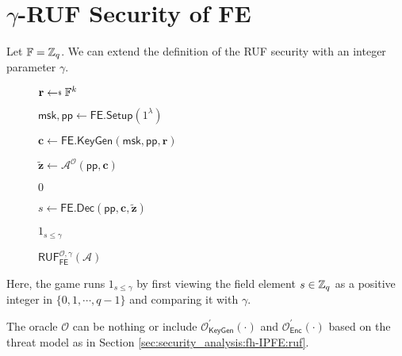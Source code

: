 
\newpage


\section{$\gamma$-RUF Security of \textsf{FE}}

Let $\mathbb{F} = \mathbb{Z}_q$. We can extend the definition of the RUF security with an integer parameter $\gamma$.

\begin{figure}[H]
\centering

	\begin{minipage}[t]{0.55\textwidth}
	\begin{algorithm}[H]
	\caption{$\textsf{RUF}^{\mathcal{O}, \gamma}_{\textsf{FE}}(\mathcal{A})$}
	\label{alg:gamma-ruf-fh-IPFE}
	\begin{algorithmic}[1]
		\State $\mathbf{r} \getsdollar \mathbb{F}^{k}$

		\State $\textsf{msk}, \textsf{pp} \gets \textsf{FE.Setup}(1^\lambda)$

		\State $\mathbf{c} \gets \textsf{FE.KeyGen}(\textsf{msk}, \textsf{pp}, \mathbf{r})$

		\State $\mathbf{\tilde{z}} \gets \mathcal{A}^{\mathcal{O}} ( \textsf{pp}, \mathbf{c} )$

			
			\State \Return $0$
		
		\EndIf

		\State $s \gets \textsf{FE.Dec}(\textsf{pp}, \mathbf{c}, \mathbf{\tilde{z}} )$

		\State \Return $1_{s \leq \gamma}$
	\end{algorithmic}
	\end{algorithm}
	\end{minipage}

\end{figure}

Here, the game runs $1_{s \leq \gamma}$ by first viewing the field element $s \in \mathbb{Z}_q$ as a positive integer in $\{0, 1, \cdots, q-1 \}$ and comparing it with $\gamma$.

The oracle $\mathcal{O}$ can be nothing or include $\mathcal{O}^\prime_{\textsf{KeyGen}}(\cdot)$ and $\mathcal{O}^\prime_{\textsf{Enc}}(\cdot)$ based on the threat model as in Section \ref{sec:security_analysis:fh-IPFE:ruf}.

